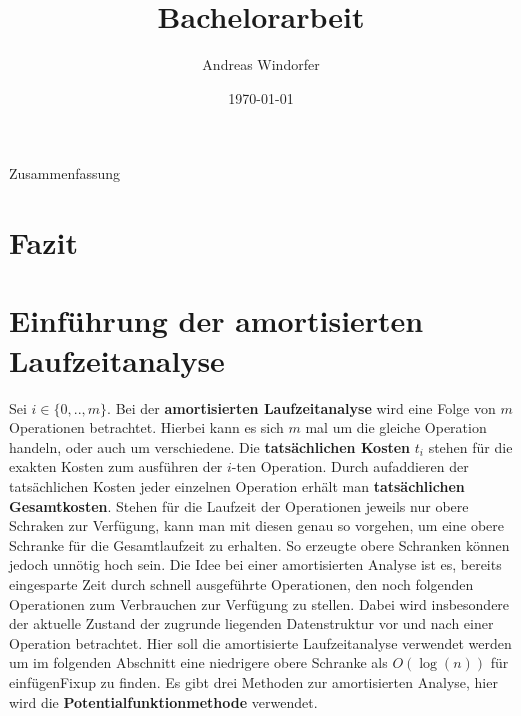\documentclass[a4paper,12pt]{article}
\title{Bachelorarbeit}
\author{

	Andreas Windorfer \\
}
\date{\today}
\begin{document}
\maketitle
\newpage
Zusammenfassung
\newpage
\tableofcontents


\newpage

\section{Fazit}




\section{Einführung der amortisierten Laufzeitanalyse}
Sei $i \in \{0,..,m\}$. Bei der \textbf{amortisierten Laufzeitanalyse} wird eine Folge von $m$ Operationen betrachtet. Hierbei kann es sich $m$ mal um die gleiche Operation handeln, oder auch um verschiedene. Die \textbf{tatsächlichen Kosten}  $t_i$ stehen für die exakten Kosten zum ausführen der $i$-ten Operation. Durch aufaddieren der tatsächlichen Kosten jeder einzelnen Operation erhält man \textbf{tatsächlichen Gesamtkosten}. Stehen für die Laufzeit der Operationen jeweils nur obere Schraken zur Verfügung, kann man mit diesen genau so vorgehen, um eine obere Schranke für die Gesamtlaufzeit zu erhalten. So erzeugte obere Schranken können jedoch unnötig hoch sein. Die Idee bei einer amortisierten Analyse ist es, bereits eingesparte Zeit durch schnell ausgeführte Operationen, den noch folgenden Operationen zum Verbrauchen zur Verfügung zu stellen.  Dabei wird insbesondere der aktuelle Zustand der zugrunde liegenden Datenstruktur vor und nach einer Operation betrachtet. Hier soll die amortisierte Laufzeitanalyse verwendet werden um im folgenden Abschnitt eine niedrigere obere Schranke als $O(\log(n))$ für einfügenFixup zu finden. Es gibt drei Methoden zur amortisierten Analyse, hier wird die \textbf{Potentialfunktionmethode} verwendet.
\end{document}
